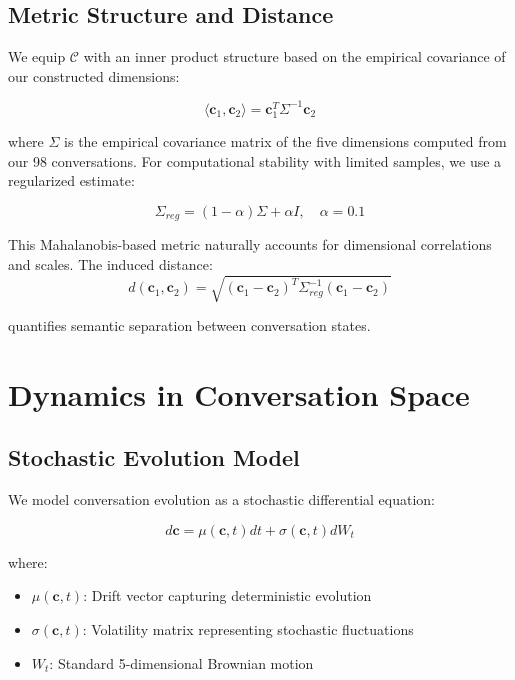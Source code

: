 \documentclass[11pt,letterpaper]{article}
\newcommand{\totalConversations}{98}
\newcommand{\regularizationAlpha}{0.1}
\begin{document}
\subsection{Metric Structure and Distance}

We equip $\mathcal{C}$ with an inner product structure based on the empirical covariance of our constructed dimensions:

\begin{equation}
\langle \mathbf{c}_1, \mathbf{c}_2 \rangle = \mathbf{c}_1^T \Sigma^{-1} \mathbf{c}_2
\end{equation}

where $\Sigma$ is the empirical covariance matrix of the five dimensions computed from our \totalConversations{} conversations. For computational stability with limited samples, we use a regularized estimate:

\begin{equation}
\Sigma_{reg} = (1-\alpha)\Sigma + \alpha I, \quad \alpha = \regularizationAlpha{}
\end{equation}

This Mahalanobis-based metric naturally accounts for dimensional correlations and scales. The induced distance:
\begin{equation}
d(\mathbf{c}_1, \mathbf{c}_2) = \sqrt{(\mathbf{c}_1 - \mathbf{c}_2)^T \Sigma_{reg}^{-1} (\mathbf{c}_1 - \mathbf{c}_2)}
\end{equation}

quantifies semantic separation between conversation states.

\section{Dynamics in Conversation Space}

\subsection{Stochastic Evolution Model}

We model conversation evolution as a stochastic differential equation:

\begin{equation}
d\mathbf{c} = \mu(\mathbf{c}, t)dt + \sigma(\mathbf{c}, t)dW_t
\end{equation}

where:
\begin{itemize}
    \item $\mu(\mathbf{c}, t)$: Drift vector capturing deterministic evolution
    \item $\sigma(\mathbf{c}, t)$: Volatility matrix representing stochastic fluctuations
    \item $W_t$: Standard 5-dimensional Brownian motion
\end{itemize}
\end{document}
